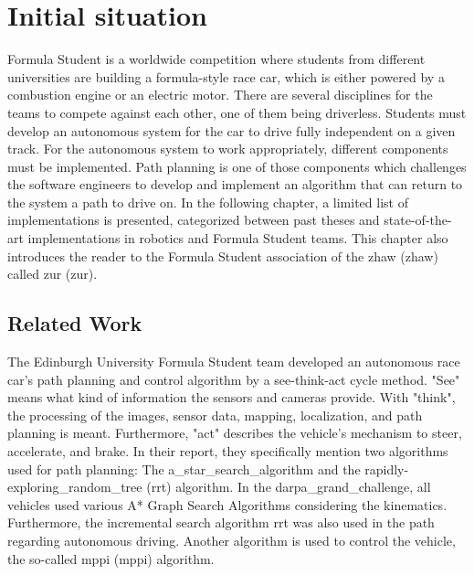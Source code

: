 \section{Initial situation} \label{sec:Initial situation}
Formula Student is a worldwide competition where students from different universities are building a formula-style race car, which is either powered by a combustion engine or an electric motor. There are several disciplines for the teams to compete against each other, one of them being \Gls{driverless}. Students must develop an autonomous system for the car to drive fully independent on a given track. For the autonomous system to work appropriately, different components must be implemented. Path planning is one of those components which challenges the software engineers to develop and implement an algorithm that can return to the system a path to drive on. In the following chapter, a limited list of implementations is presented, categorized between past theses and state-of-the-art implementations in robotics and Formula Student teams. This chapter also introduces the reader to the Formula Student association of the \acrlong{zhaw} (\acrshort{zhaw}) called \acrlong{zur} (\acrshort{zur}).

\subsection{Related Work} \label{sec:Related Work}
The Edinburgh University Formula Student team developed an autonomous race car's path planning and control algorithm by a see-think-act cycle method. "See" means what kind of information the sensors and cameras provide. With "think", the processing of the images, sensor data, mapping, localization, and path planning is meant. Furthermore, "act" describes the vehicle's mechanism to steer, accelerate, and brake. \cite{path_planning_and_control_georgiev}
In their report, they specifically mention two algorithms used for path planning: The \Gls{a_star_search_algorithm} and the \Gls{rapidly-exploring_random_tree} (\acrshort{rrt}) algorithm. In the \Gls{darpa_grand_challenge}, all vehicles used various A* Graph Search Algorithms considering the kinematics. Furthermore, the incremental search algorithm \acrshort{rrt} was also used in the path regarding autonomous driving. \cite{darpa_grand_challenge}
Another algorithm is used to control the vehicle, the so-called \acrlong{mppi} (\acrshort{mppi}) algorithm. \cite{model_predictive_path_integration}

\pagebreak

